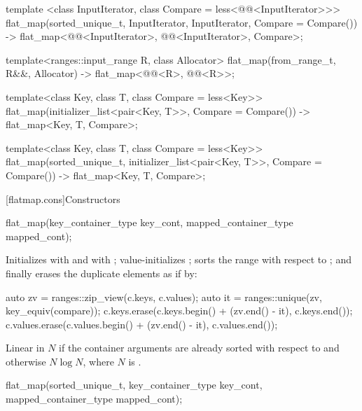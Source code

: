 \begin{addedblock}
\begin{codeblock}
{  template <class InputIterator, class Compare = less<@@<InputIterator>>>
    flat_map(sorted_unique_t, InputIterator, InputIterator, Compare = Compare())
      -> flat_map<@@<InputIterator>, @@<InputIterator>, Compare>;

  template<ranges::input_range R, class Allocator>
    flat_map(from_range_t, R&&, Allocator)
      -> flat_map<@@<R>, @@<R>>;

  template<class Key, class T, class Compare = less<Key>>
    flat_map(initializer_list<pair<Key, T>>, Compare = Compare())
      -> flat_map<Key, T, Compare>;

  template<class Key, class T, class Compare = less<Key>>
  flat_map(sorted_unique_t, initializer_list<pair<Key, T>>, Compare = Compare())
      -> flat_map<Key, T, Compare>;
}
\end{codeblock}

[flatmap.cons]{Constructors}

%
\begin{itemdecl}
flat_map(key_container_type key_cont, mapped_container_type mapped_cont);
\end{itemdecl}

\begin{itemdescr}
\pnum
\effects Initializes  with  and
 with ; value-initializes
; sorts the range  with respect to
; and finally erases the duplicate elements
as if by:
\begin{codeblock}
auto zv = ranges::zip_view(c.keys, c.values);
auto it = ranges::unique(zv, key_equiv(compare));
c.keys.erase(c.keys.begin() + (zv.end() - it), c.keys.end());
c.values.erase(c.values.begin() + (zv.end() - it), c.values.end());
\end{codeblock}

\pnum
\complexity
Linear in $N$ if the container arguments are already sorted with respect
to  and otherwise $N \log N$, where $N$
is .
\end{itemdescr}

%
\begin{itemdecl}
flat_map(sorted_unique_t, key_container_type key_cont, mapped_container_type mapped_cont);
\end{itemdecl}


\end{addedblock}
